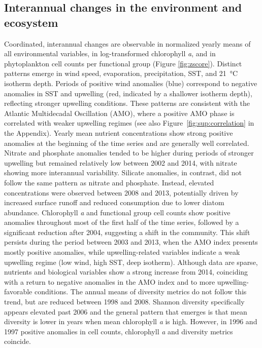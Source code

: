 \documentclass[draft]{agujournal2019}
\begin{document}
\subsection{Interannual changes in the environment and ecosystem}
    Coordinated, interannual changes are observable in normalized yearly means of all environmental variables, in log-transformed chlorophyll \textit{a}, and in phytoplankton cell counts per functional group (Figure \ref{fig:zscore}). Distinct patterns emerge in wind speed, evaporation, precipitation, SST, and \qty{21}{\celsius} isotherm depth. Periods of positive wind anomalies (blue) correspond to negative anomalies in SST and upwelling (red, indicated by a shallower isotherm depth), reflecting stronger upwelling conditions. These patterns are consistent with the Atlantic Multidecadal Oscillation (AMO), where a positive AMO phase is correlated with weaker upwelling regimes (see also Figure~\ref{fig:sup:correlation} in the Appendix). Yearly mean nutrient concentrations show strong positive anomalies at the beginning of the time series and are generally well correlated. Nitrate and phosphate anomalies tended to be higher during periods of stronger upwelling but remained relatively low between 2002 and 2014, with nitrate showing more interannual variability. Silicate anomalies, in contrast, did not follow the same pattern as nitrate and phosphate. Instead, elevated concentrations were observed between 2008 and 2013, potentially driven by increased surface runoff \cite{lorenzoni_characterization_2015} and reduced consumption due to lower diatom abundance.
    Chlorophyll \textit{a} and functional group cell counts show positive anomalies throughout most of the first half of the time series, followed by a significant reduction after 2004, suggesting a shift in the community. This shift persists during the period between 2003 and 2013, when the AMO index presents mostly positive anomalies, while upwelling-related variables indicate a weak upwelling regime (low wind, high SST, deep isotherm). Although data are sparse, nutrients and biological variables show a strong increase from 2014, coinciding with a return to negative anomalies in the AMO index and to more upwelling-favorable conditions.
    The annual means of diversity metrics do not follow this trend, but are reduced between 1998 and 2008. Shannon diversity specifically appears elevated past 2006 and the general pattern that emerges is that mean diversity is lower in years when mean chlorophyll \textit{a} is high. However, in 1996 and 1997 positive anomalies in cell counts, chlorophyll \textit{a} and diversity metrics coincide.
    
\end{document}
